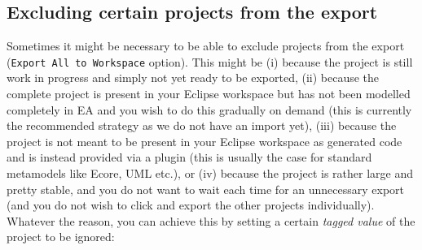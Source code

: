 \newpage
\subsection{Excluding certain projects from the export}

Sometimes it might be necessary to be able to exclude projects from the export (\texttt{Export All to Workspace} option).
This might be (i) because the project is still work in progress and simply not yet ready to be exported, (ii) because the complete project is present in your
Eclipse workspace but has not been modelled completely in EA and you wish to do this gradually on demand (this is currently the recommended strategy as we do
not have an import yet), (iii) because the project is not meant to be present in your Eclipse workspace as generated code and is instead provided via a plugin
(this is usually the case for standard metamodels like Ecore, UML etc.), or (iv) because the project is rather large and pretty stable, and you do not want to
wait each time for an unnecessary export (and you do not wish to click and export the other projects individually).
Whatever the reason, you can achieve this by setting a certain \emph{tagged value} of the project to be ignored:

